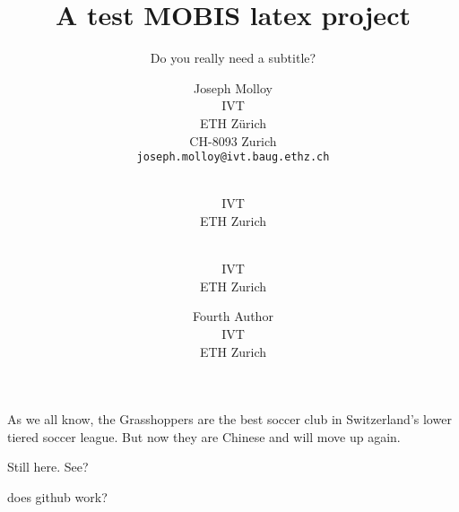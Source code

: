 \documentclass[numbered]{ivt-style/standard}
\title{A test MOBIS latex project}
\subtitle{Do you really need a subtitle?}
\author{
  Joseph Molloy \\
  IVT \\
  ETH Zürich \\
  CH-8093 Zurich \\
  \texttt{joseph.molloy@ivt.baug.ethz.ch}
  \and
 \\
  IVT \\
  ETH Zurich
  \and \\
  IVT \\
  ETH Zurich
  \and
  Fourth Author \\
  IVT \\
  ETH Zurich
}
\begin{document}
\maketitle
\clearpage

As we all know, the Grasshoppers are the best soccer club in Switzerland's lower tiered soccer league. 
But now they are Chinese and will move up again. 

Still here. See?

does github work?



\tableofcontents
\listoftables
\listoffigures
\newpage






\nolinenumbers

%

\clearpage


\clearpage
\end{document}

